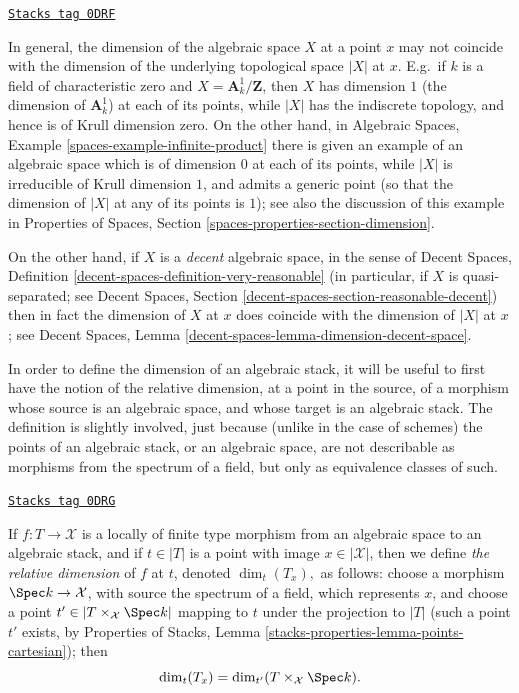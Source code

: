 \begin{remark}
\label{stacks-geometry-remark-dimension-algebraic-space}
\href{https://stacks.math.columbia.edu/tag/0DRF}{\texttt{Stacks tag 0DRF}}

In general, the dimension of the algebraic space $X$ at a point $x$
may not coincide with the dimension of the underlying topological space
$|X|$ at $x$.  E.g.\ if $k$ is a field of characteristic zero and
$X =  \mathbf{A}^1_k / \mathbf{Z}$, then $X$ has dimension $1$ (the dimension
of $\mathbf{A}^1_k$) at each of its points,
while $|X|$ has the indiscrete topology, and hence is of Krull
dimension zero. On the other hand, in
Algebraic Spaces, Example \ref{spaces-example-infinite-product}
there is given an example of an algebraic space
which is of dimension $0$ at each of its points, while $|X|$ is
irreducible of Krull dimension $1$, and admits a generic point (so that the
dimension of $|X|$ at any of its points is $1$); see also the discussion
of this example in
Properties of Spaces, Section \ref{spaces-properties-section-dimension}.

\medskip\noindent
On the other hand, if $X$ is a {\it decent} algebraic space, in the sense of
Decent Spaces, Definition \ref{decent-spaces-definition-very-reasonable}
(in particular, if $X$ is quasi-separated; see
Decent Spaces, Section \ref{decent-spaces-section-reasonable-decent})
then in fact the dimension of $X$ at $x$ does coincide with the dimension
of $|X|$ at $x$; see
Decent Spaces, Lemma \ref{decent-spaces-lemma-dimension-decent-space}.
\end{remark}

In order to  define the dimension of an algebraic stack,
it will be useful to first have the notion of the relative dimension,
at a point in the source,
of a morphism whose source is an algebraic space,
and whose target is an algebraic stack.  The definition is slightly
involved, just because (unlike in the case of schemes) the points of an
algebraic stack, or an algebraic
space, are not describable as morphisms from the spectrum of a field,
but only as equivalence classes of such.

\begin{definition}
\label{stacks-geometry-definition-relative-dimension}
\href{https://stacks.math.columbia.edu/tag/0DRG}{\texttt{Stacks tag 0DRG}}

If $f : T \to \mathcal{X}$ is a locally of finite type morphism from an
algebraic space to an algebraic stack,
and if $t \in |T|$ is a point with image $x \in | \mathcal{X}|$, then we define
{\it the relative dimension} of $f$ at $t$, denoted
$\dim_t(T_x),$
as follows:
choose a morphism $\Spec k \to \mathcal{X}$, with source the spectrum of
a field, which represents $x$, and choose a point
$t' \in |T \times_{\mathcal{X}} \Spec k|$
mapping to $t$ under the projection to $|T|$
(such a point $t'$ exists, by
Properties of Stacks, Lemma \ref{stacks-properties-lemma-points-cartesian});
then
$$
\dim_t(T_x) = \dim_{t'}(T \times_{\mathcal{X}} \Spec k ).
$$
\end{definition}

